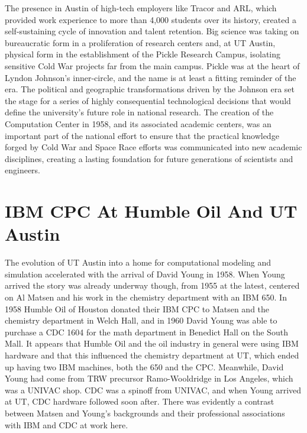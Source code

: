 The presence in Austin of high-tech employers like Tracor and ARL, which provided work experience to more than 4,000 students over its history, created a self-sustaining cycle of innovation and talent retention. Big science was taking on bureaucratic form in a proliferation of research centers and, at UT Austin, physical form in the establishment of the Pickle Research Campus, isolating sensitive Cold War projects far from the main campus. Pickle was at the heart of Lyndon Johnson’s inner-circle, and the name is at least a fitting reminder of the era. The political and geographic transformations driven by the Johnson era set the stage for a series of highly consequential technological decisions that would define the university's future role in national research. The creation of the Computation Center in 1958, and its associated academic centers, was an important part of the national effort to ensure that the practical knowledge forged by Cold War and Space Race efforts was communicated into new academic disciplines, creating a lasting foundation for future generations of scientists and engineers.

\section{IBM CPC At Humble Oil And UT Austin}

The evolution of UT Austin into a home for computational modeling and simulation accelerated with the arrival of David Young in 1958. When Young arrived the story was already underway though, from 1955 at the latest, centered on Al Matsen and his work in the chemistry department with an IBM 650. In 1958 Humble Oil of Houston donated their IBM CPC to Matsen and the chemistry department in Welch Hall, and in 1960 David Young was able to purchase a CDC 1604 for the math department in Benedict Hall on the South Mall. It appears that Humble Oil and the oil industry in general were using IBM hardware and that this influenced the chemistry department at UT, which ended up having two IBM machines, both the 650 and the CPC. Meanwhile, David Young had come from TRW precursor Ramo-Wooldridge in Los Angeles, which was a UNIVAC shop. CDC was a spinoff from UNIVAC, and when Young arrived at UT, CDC hardware followed soon after. There was evidently a contrast between Matsen and Young's backgrounds and their professional associations with IBM and CDC at work here. 

